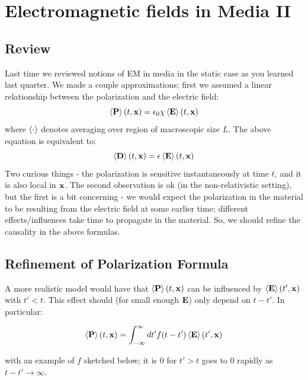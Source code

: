 \section{Electromagnetic fields in Media II}

\subsection{Review}
Last time we reviewed notions of EM in media in the static case as you learned last quarter. We made a couple approximations; first we assumed a linear relationship between the polarization and the electric field:
\begin{equation}
    \left< \mathbf{P} \right>(t, \mathbf{x}) = \epsilon_0 \chi \left< \mathbf{E} \right>(t, \mathbf{x})
\end{equation}
where $\left< \cdot \right>$ denotes averaging over region of macroscopic size $L$. The above equation is equivalent to:
\begin{equation}
    \left< \mathbf{D} \right>(t, \mathbf{x}) = \epsilon\left< \mathbf{E} \right>(t, \mathbf{x})
\end{equation}
Two curious things - the polarization is sensitive instantaneously at time $t$, and it is also local in $\mathbf{x}$. The second observation is ok (in the non-relativistic setting), but the first is a bit concerning - we would expect the polarization in the material to be resulting from the electric field at some earlier time; different effects/influences take time to propagate in the material. So, we should refine the causality in the above formulas.

\subsection{Refinement of Polarization Formula}
A more realistic model would have that $\left< \mathbf{P} \right>(t, \mathbf{x})$ can be influenced by $\left< \mathbf{E} \right>(t', \mathbf{x})$ with $t' < t$. This effect should (for small enough $\mathbf{E}$) only depend on $t - t'$. In particular:

\begin{equation}
    \left< \mathbf{P} \right>(t, \mathbf{x}) = \int_{-\infty}^\infty dt' f(t - t')\left< \mathbf{E} \right>(t', \mathbf{x})
\end{equation}

with an example of $f$ sketched below; it is $0$ for $t' > t$ goes to 0 rapidly as $t - t' \to \infty$. 

